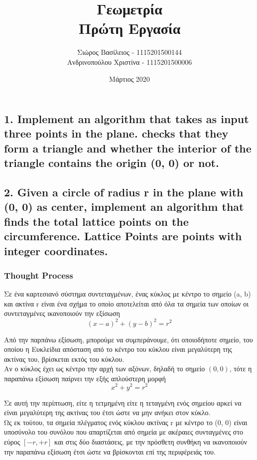 \documentclass[12pt]{article}
\title{\hugeΥπολογιστική Γεωμετρία\\Πρώτη Εργασία}
\author{Σιώρος Βασίλειος - 1115201500144\\Ανδρινοπούλου Χριστίνα - 1115201500006}
\date{Μάρτιος 2020}
\begin{document}
\maketitle


\pagebreak


\subsection*{1. Implement an algorithm that takes as input three points in the plane. checks
that they form a triangle and whether the interior of the triangle contains the origin (0, 0) or
not.}

\pagebreak

\subsection*{2. Given a circle of radius r in the plane with (0, 0) as center, implement an
algorithm that finds the total lattice points on the circumference. Lattice Points are points
with integer coordinates.}

\subsubsection*{Thought Process}

Σε ένα καρτεσιανό σύστημα συντεταγμένων, ένας κύκλος με κέντρο το σημείο (a, b)
και ακτίνα r είναι ένα σχήμα το οποίο αποτελείται από όλα τα σημεία των οποίων
οι συντεταγμένες ικανοποιούν την εξίσωση \\

\[ (x - a) ^ 2 + (y - b) ^ 2 = r ^ 2 \]

Από την παρπάνω εξίσωση, μπορούμε να συμπεράνουμε,
ότι οποιοδήποτε σημείο, του οποίου η Ευκλείδια απόσταση από το κέντρο του κύκλου
είναι μεγαλύτερη της ακτίνας του, βρίσκεται εκτός του κύκλου. \\

Αν ο κύκλος έχει ως κέντρο την αρχή των αξόνων, δηλαδή το σημείο \( (0, 0) \), τότε
η παραπάνω εξίσωση παίρνει την εξής απλούστερη μορφή \\

\[ x ^ 2 + y ^ 2 = r ^ 2 \]

Σε αυτή την περίπτωση, είτε η τετμημένη είτε η τεταγμένη ενός σημείου
αρκεί να είναι μεγαλύτερη της ακτίνας του έτσι ώστε να μην ανήκει στον κύκλο. \\

Ως εκ τούτου, τα σημεία πλέγματος ενός κύκλου ακτίνας r με κέντρο το (0, 0)
είναι υποσύνολο του συνόλου που απαρτίζεται από σημεία με ακέραιες συνταγμένες
στο εύρος \( [-r, +r] \) και στις δύο διαστάσεις, με την πρόσθετη συνθήκη
να ικανοποιούν την παραπάνω εξίσωση έτσι ώστε να βρίσκονται επί της
περιφέρειάς του. \\
\end{document}
